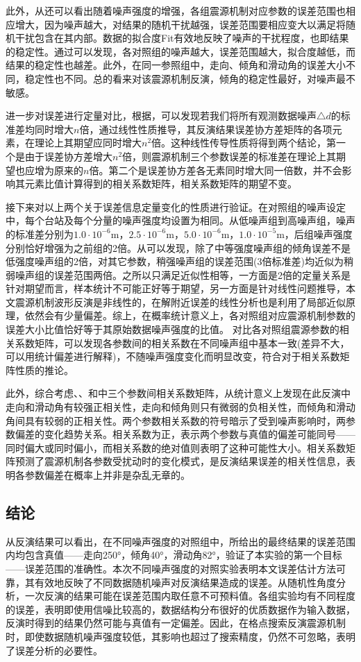此外，从还可以看出随着噪声强度的增强，各组震源机制对应参数的误差范围也相应增大，因为噪声越大，对结果的随机干扰越强，误差范围要相应变大以满足将随机干扰包含在其内部。数据的拟合度Fit有效地反映了噪声的干扰程度，也即结果的稳定性。通过可以发现，各对照组的噪声越大，误差范围越大，拟合度越低，而结果的稳定性也越差。此外，在同一参照组中，走向、倾角和滑动角的误差大小不同，稳定性也不同。总的看来对该震源机制反演，倾角的稳定性最好，对噪声最不敏感。

进一步对误差进行定量对比，根据，可以发现若我们将所有观测数据噪声${\triangle}d$的标准差均同时增大$n$倍，通过线性性质推导，其反演结果误差协方差矩阵的各项元素，在理论上其期望应同时增大$n^2$倍。这种线性传导性质将得到两个结论，第一个是由于误差协方差增大$n^2$倍，则震源机制三个参数误差的标准差在理论上其期望也应增为原来的$n$倍。第二个是误差协方差各无素同时增大同一倍数，并不会影响其元素比值计算得到的相关系数矩阵，相关系数矩阵的期望不变。

接下来对以上两个关于误差信息定量变化的性质进行验证。在对照组的噪声设定中，每个台站及每个分量的噪声强度均设置为相同。从低噪声组到高噪声组，噪声的标准差分别为$1.0\cdot10^{-6}$m，$2.5\cdot10^{-6}$m，$5.0\cdot10^{-6}$m，$1.0\cdot10^{-5}$m，后组噪声强度分别恰好增强为之前组的2倍。从可以发现，除了中等强度噪声组的倾角误差不是低强度噪声组的2倍，对其它参数，稍强噪声组的误差范围(3倍标准差)均近似为稍弱噪声组的误差范围两倍。之所以只满足近似性相等，一方面是2倍的定量关系是针对期望而言，样本统计不可能正好等于期望，另一方面是针对线性问题推导，本文震源机制波形反演是非线性的，在解附近误差的线性分析也是利用了局部近似原理，依然会有少量偏差。综上，在概率统计意义上，各对照组对应震源机制参数的误差大小比值恰好等于其原始数据噪声强度的比值。
对比各对照组震源参数的相关系数矩阵，可以发现各参数间的相关系数在不同噪声组中基本一致(差异不大，可以用统计偏差进行解释)，不随噪声强度变化而明显改变，符合对于相关系数矩阵性质的推论。

此外，综合考虑、、和中三个参数间相关系数矩阵，从统计意义上发现在此反演中走向和滑动角有较强正相关性，走向和倾角则只有微弱的负相关性，而倾角和滑动角间具有较弱的正相关性。两个参数相关系数的符号暗示了受到噪声影响时，两参数偏差的变化趋势关系。相关系数为正，表示两个参数与真值的偏差可能同号——同时偏大或同时偏小，而相关系数的绝对值则表明了这种可能性大小。相关系数矩阵预测了震源机制各参数受扰动时的变化模式，是反演结果误差的相关性信息，表明各参数偏差在概率上并非是杂乱无章的。

\subsection{结论}
从反演结果可以看出，在不同噪声强度的对照组中，所给出的最终结果的误差范围内均包含真值——走向250°，倾角40°，滑动角82°，验证了本实验的第一个目标——误差范围的准确性。本次不同噪声强度的对照实验表明本文误差估计方法可靠，其有效地反映了不同数据随机噪声对反演结果造成的误差。从随机性角度分析，一次反演的结果可能在误差范围内取任意不可预料值。各组实验均有不同程度的误差，表明即使用信噪比较高的，数据结构分布很好的优质数据作为输入数据，反演时得到的结果仍然可能与真值有一定偏差。因此，在格点搜索反演震源机制时，即使数据随机噪声强度较低，其影响也超过了搜索精度，仍然不可忽略，表明了误差分析的必要性。

